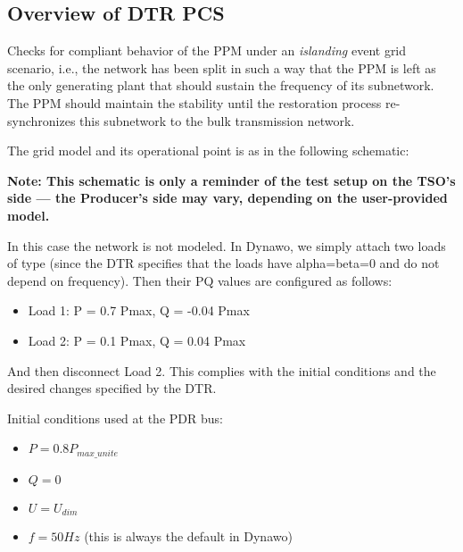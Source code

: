     \subsection{Overview of DTR PCS \DTRPcs}

    Checks for compliant behavior of the PPM under an \emph{islanding} event grid
    scenario, i.e., the network has been split in such a way that the PPM is left as
    the only generating plant that should sustain the frequency of its
    subnetwork. The PPM should maintain the stability until the restoration process
    re-synchronizes this subnetwork to the bulk transmission network.

    The grid model and its operational point is as in the following schematic:
    \begin{center}
        
    \end{center}
    \begin{center}
        \small \textbf{Note: This schematic is only a reminder of the test setup on the TSO's
        side --- the Producer's side may vary, depending on the user-provided model.}
    \end{center}

    In this case the network is not modeled. In Dynawo, we simply attach
    two loads of type  (since the DTR specifies that the
    loads have alpha=beta=0 and do not depend on frequency). Then their
    PQ values are configured as follows:
    \begin{itemize}
        \item Load 1: P = 0.7 Pmax, Q = -0.04 Pmax
        \item Load 2: P = 0.1 Pmax, Q = 0.04 Pmax
    \end{itemize}
    And then disconnect Load 2. This complies with the initial conditions
    and the desired changes specified by the DTR.

    \begin{description}
        \item Initial conditions used at the PDR bus:
        \begin{itemize}
            \item $P = 0.8 P_{max\_unite}$
            \item $Q = 0$
            \item $U = U_{dim}$
            \item $f = 50 Hz$ (this is always the default in Dynawo)
        \end{itemize}
    \end{description}

